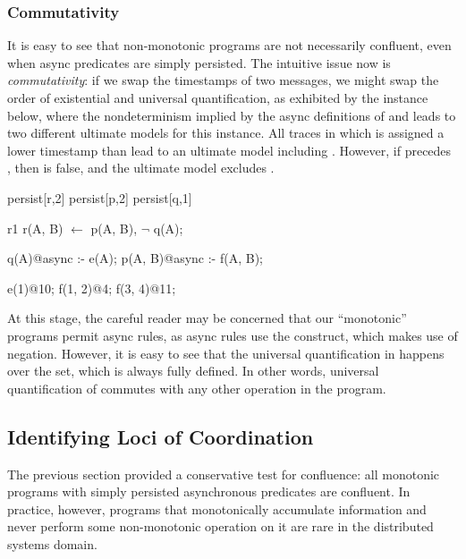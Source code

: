 \subsubsection{Commutativity}

It is easy to see that non-monotonic programs are not necessarily confluent,
even when async predicates are simply persisted.  The intuitive issue now is
{\em commutativity}: if we swap the timestamps of two messages, we might swap
the order of existential and universal quantification, as exhibited by the
instance below, where the 
nondeterminism implied by the async definitions of  and 
leads to two different ultimate models for this instance.  All traces in which
 is assigned a lower timestamp than  lead to an ultimate
model including .  However, if  precedes
, then  is false, and the ultimate model
excludes .

\begin{Dedalus}
persist[r,2]
persist[p,2]
persist[q,1]

r1
r(A, B) \(\leftarrow\) 
    p(A, B), \(\lnot\) q(A);

q(A)@async :- e(A);
p(A, B)@async :- f(A, B);

e(1)@10;
f(1, 2)@4;
f(3, 4)@11; 
\end{Dedalus} 

At this stage, the careful reader may be concerned that our ``monotonic''
programs permit async rules, as async rules use the  construct,
which makes use of negation.  However, it is easy to see that the universal
quantification in  happens over the  set, which
is always fully defined.  In other words, universal quantification of
 commutes with any other operation in the program.


\subsection{Identifying Loci of Coordination}
The previous section provided a conservative test for confluence: all monotonic
programs with simply persisted asynchronous predicates are confluent.  In
practice, however, programs that monotonically accumulate information and never
perform some non-monotonic operation on it are rare in the distributed systems
domain.

